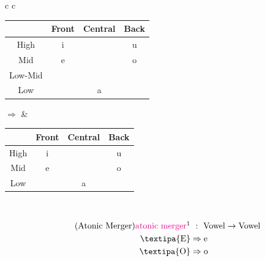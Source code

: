 \documentclass{report}[12pt]
\begin{document}
\begin{tcolorbox}
  \begin{tabular}{c c}
    \begin{tabular}{|c|c|c|c|}
      \hline
      & Front & Central & Back \\
      \hline
      High & i & & u \\
      \hline
      Mid & e & & o \\
      \hline
      Low-Mid & \cellcolor{gray} \textipa{E} & & \cellcolor{gray} \textipa{O} \\
      \hline
      Low & & a & \\
      \hline
    \end{tabular} \quad $\Rightarrow$ & 
    \begin{tabular}{|c|c|c|c|}
      \hline
      & Front & Central & Back \\
      \hline
      High & i & & u \\
      \hline
      Mid & \cellcolor{magenta} e & & \cellcolor{magenta} o \\
      \hline
      Low & & a & \\
      \hline
    \end{tabular} \\
  \end{tabular} 
  \tcblower
  \begin{align*}\tag{Atonic Merger}\label{eq:atonic_merger}
    \text{\textcolor{magenta}{atonic merger}}\footnotemark &\ :\ \text{Vowel} \rightarrow \text{Vowel} \\
    \text{\textipa{E}} & \Rightarrow \text{e} \\
    \text{\textipa{O}} & \Rightarrow \text{o} \\
  \end{align*}
\end{tcolorbox}
\end{document}
